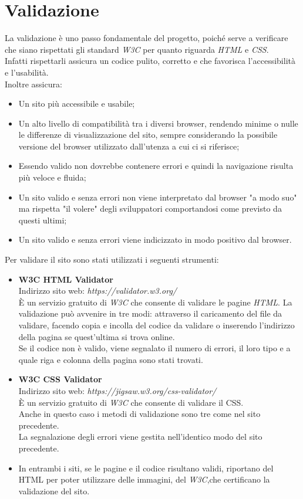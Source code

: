 \section{Validazione}
La validazione è uno passo fondamentale del progetto, poiché serve a verificare che siano rispettati gli standard \emph{W3C} per quanto riguarda \emph{HTML} e \emph{CSS}.\\
Infatti rispettarli assicura un codice pulito, corretto e che favorisca l'accessibilità e l'usabilità.\\
Inoltre assicura:
\begin{itemize}
	\item Un sito più accessibile e usabile;
	\item Un alto livello di compatibilità tra i diversi browser, rendendo minime o nulle le differenze di visualizzazione del sito, sempre considerando la possibile versione del browser utilizzato dall'utenza a cui ci si riferisce;
	\item Essendo valido non dovrebbe contenere errori e quindi la navigazione risulta più veloce e fluida;
	\item Un sito valido e senza errori non viene interpretato dal browser "a modo suo" ma rispetta "il volere" degli sviluppatori comportandosi come previsto da questi ultimi; %
	\item Un sito valido e senza errori viene indicizzato in modo positivo dal browser.  %
\end{itemize}
Per validare il sito sono stati utilizzati i seguenti strumenti:
\begin{itemize}
	\item \textbf{W3C HTML Validator}\\
	Indirizzo sito web: \emph{https://validator.w3.org/}\\
	È un servizio gratuito di \emph{W3C} che consente di validare le pagine \emph{HTML}.
	La validazione può avvenire in tre modi: attraverso il caricamento del file da validare, facendo copia e incolla del codice da validare o inserendo l'indirizzo della pagina se quest'ultima si trova online.\\
Se il codice non è valido, viene segnalato il numero di errori, il loro tipo e a quale riga e colonna della pagina sono stati trovati.
	\item \textbf{W3C CSS Validator}\\
	Indirizzo sito web: \emph{https://jigsaw.w3.org/css-validator/}\\
	È un servizio gratuito di \emph{W3C} che consente di validare il CSS.\\
	Anche in questo caso i metodi di validazione sono tre come nel sito precedente.\\
	La segnalazione degli errori viene gestita nell'identico modo del sito precedente.\\
	 \item In entrambi i siti, se le pagine e il codice risultano validi, riportano del HTML per poter utilizzare delle immagini, del \emph{W3C},che certificano la validazione del sito.
\end{itemize}